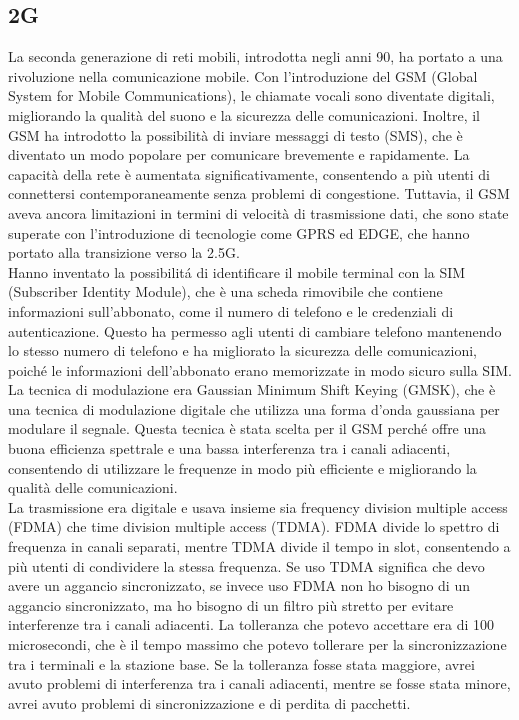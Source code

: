 \subsection{2G}
La seconda generazione di reti mobili, introdotta negli anni 90, ha portato a una rivoluzione nella comunicazione mobile. Con l'introduzione del GSM (Global System for Mobile Communications), le chiamate vocali sono diventate digitali, migliorando la qualità del suono e la sicurezza delle comunicazioni. Inoltre, il GSM ha introdotto la possibilità di inviare messaggi di testo (SMS), che è diventato un modo popolare per comunicare brevemente e rapidamente. La capacità della rete è aumentata significativamente, consentendo a più utenti di connettersi contemporaneamente senza problemi di congestione. Tuttavia, il GSM aveva ancora limitazioni in termini di velocità di trasmissione dati, che sono state superate con l'introduzione di tecnologie come GPRS ed EDGE, che hanno portato alla transizione verso la 2.5G.\\
Hanno inventato la possibilitá di identificare il mobile terminal con la SIM (Subscriber Identity Module), che è una scheda rimovibile che contiene informazioni sull'abbonato, come il numero di telefono e le credenziali di autenticazione. Questo ha permesso agli utenti di cambiare telefono mantenendo lo stesso numero di telefono e ha migliorato la sicurezza delle comunicazioni, poiché le informazioni dell'abbonato erano memorizzate in modo sicuro sulla SIM.
La tecnica di modulazione era Gaussian Minimum Shift Keying (GMSK), che è una tecnica di modulazione digitale che utilizza una forma d'onda gaussiana per modulare il segnale. Questa tecnica è stata scelta per il GSM perché offre una buona efficienza spettrale e una bassa interferenza tra i canali adiacenti, consentendo di utilizzare le frequenze in modo più efficiente e migliorando la qualità delle comunicazioni.\\
La trasmissione era digitale e usava insieme sia frequency division multiple access (FDMA) che time division multiple access (TDMA). FDMA divide lo spettro di frequenza in canali separati, mentre TDMA divide il tempo in slot, consentendo a più utenti di condividere la stessa frequenza. Se uso TDMA significa che devo avere un aggancio sincronizzato, se invece uso FDMA non ho bisogno di un aggancio sincronizzato, ma ho bisogno di un filtro più stretto per evitare interferenze tra i canali adiacenti.
La tolleranza che potevo accettare era di 100 microsecondi, che è il tempo massimo che potevo tollerare per la sincronizzazione tra i terminali e la stazione base. Se la tolleranza fosse stata maggiore, avrei avuto problemi di interferenza tra i canali adiacenti, mentre se fosse stata minore, avrei avuto problemi di sincronizzazione e di perdita di pacchetti.\\

